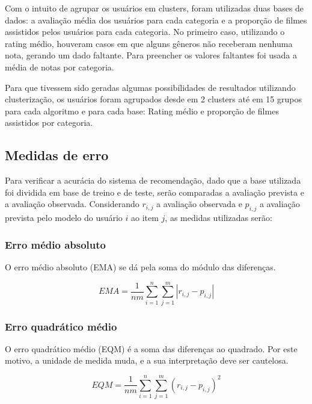\documentclass[12pt,a4paper,header]{abnt}
\begin{document}
Com o intuito de agrupar os usuários em clusters, foram utilizadas duas bases de dados: a avaliação média dos usuários para cada categoria e a proporção de filmes assistidos pelos usuários para cada categoria. No primeiro caso, utilizando o rating médio, houveram casos em que alguns gêneros não receberam nenhuma nota, gerando um dado faltante. Para preencher os valores faltantes foi usada a média de notas por categoria.

Para que tivessem sido geradas algumas possibilidades de resultados utilizando clusterização, os usuários foram agrupados desde em 2 clusters até em 15 grupos para cada algoritmo e para cada base: Rating médio e proporção de filmes assistidos por categoria.

\subsection{Medidas de erro}

Para verificar a acurácia do sistema de recomendação, dado que a base utilizada foi dividida em base de treino e de teste, serão comparadas a avaliação prevista e a avaliação observada. Considerando $r_{i,j}$ a avaliação observada e $p_{i,j}$ a avaliação prevista pelo modelo do usuário $i$ ao item $j$, as medidas utilizadas serão\cite{gorakala2015building}:

\subsubsection{Erro médio absoluto}

O erro médio absoluto (EMA) se dá pela soma do módulo das diferenças. 

\begin{equation}
EMA = \frac{1}{nm} \sum_{i=1}^{n} \sum_{j=1}^m \left| r_{i,j} - p_{i,j}  \right|
\end{equation}

\subsubsection{Erro quadrático médio}

O erro quadrático médio (EQM) é a soma das diferenças ao quadrado. Por este motivo, a unidade de medida muda, e a sua interpretação deve ser cautelosa.

\begin{equation}
EQM = \frac{1}{nm} \sum_{i=1}^{n} \sum_{j=1}^m \left( r_{i,j} - p_{i,j}  \right)^2
\end{equation}
\end{document}
